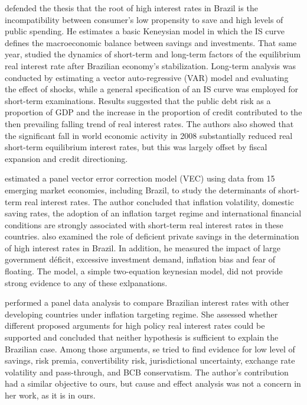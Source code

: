 \documentclass[11pt,]{article}
\begin{document}
\citet{resende} defended the thesis that the root of high interest rates
in Brazil is the incompatibility between consumer's low propensity to
save and high levels of public spending. He estimates a basic Keneysian
model in which the IS curve defines the macroeconomic balance between
savings and investments. That same year, \citet{goldfajn} studied the
dynamics of short-term and long-term factors of the equilibrium real
interest rate after Brazilian economy's stabilization. Long-term
analysis was conducted by estimating a vector auto-regressive (VAR)
model and evaluating the effect of shocks, while a general specification
of an IS curve was employed for short-term examinations. Results
suggested that the public debt risk as a proportion of GDP and the
increase in the proportion of credit contributed to the then prevailing
falling trend of real interest rates. The authors also showed that the
significant fall in world economic activity in 2008 substantially
reduced real short-term equilibrium interest rates, but this was largely
offset by fiscal expansion and credit directioning.

\citet{ubiergo} estimated a panel vector error correction model (VEC)
using data from 15 emerging market economies, including Brazil, to study
the determinants of short-term real interest rates. The author concluded
that inflation volatility, domestic saving rates, the adoption of an
inflation target regime and international financial conditions are
strongly associated with short-term real interest rates in these
countries. \citet{lopes} also examined the role of deficient private
savings in the determination of high interest rates in Brazil. In
addition, he measured the impact of large government déficit, excessive
investment demand, inflation bias and fear of floating. The model, a
simple two-equation keynesian model, did not provide strong evidence to
any of these exlpanations.

\citet{reis} performed a panel data analysis to compare Brazilian
interest rates with other developing countries under inflation targeting
regime. She assessed whether different proposed arguments for high
policy real interest rates could be supported and concluded that neither
hypothesis is sufficient to explain the Brazilian case. Among those
arguments, se tried to find evidence for low level of savings, risk
premia, convertibility risk, jurisdictional uncertainty, exchange rate
volatility and pass-through, and BCB conservatism. The author's
contribution had a similar objective to ours, but cause and effect
analysis was not a concern in her work, as it is in ours.
\end{document}
